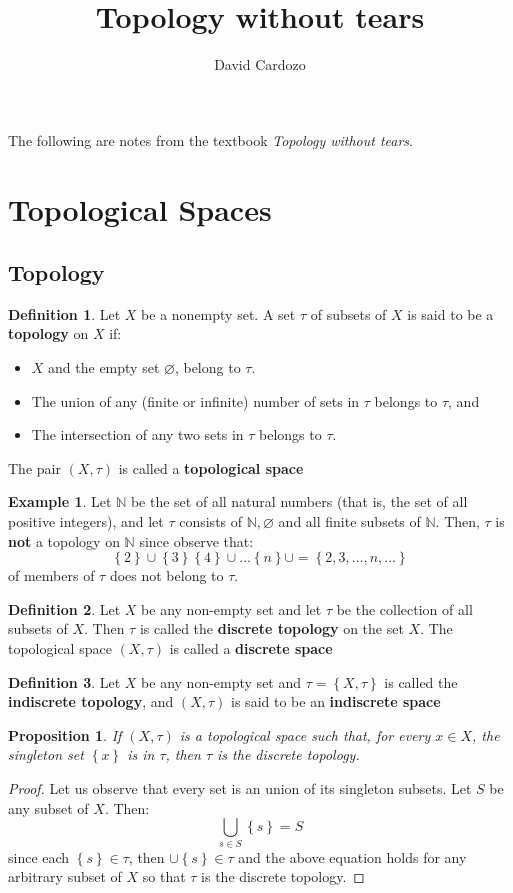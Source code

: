 \documentclass[11pt,a4paper,draft]{article}
\author{David Cardozo}
\title{Topology without tears}
\newtheorem{prop}{Proposition}[section]
\theoremstyle{definition}
\newtheorem{defn}{Definition}[section]
\newtheorem{exmp}{Example}[section]
\theoremstyle{remark}
\newcommand{\set}[1]{\left\lbrace #1 \right\rbrace}
\newcommand{\NN}{\mathbb{N}}
\begin{document}
	The following are notes from the textbook \textit{Topology without tears}.
	\section{Topological Spaces}
	\subsection{Topology}
	\begin{defn}
		Let $ X $ be a nonempty set. A set $ \tau $ of subsets of $ X $ is said to be a \textbf{topology} on $ X $ if:
		\begin{itemize}
			\item $ X $ and the empty set $ \varnothing $, belong to $ \tau $.
			\item The union of any (finite or infinite) number of sets in $ \tau $ belongs to $ \tau $, and
			\item The intersection of any two sets in $ \tau $ belongs to $ \tau $.
		\end{itemize}
		The pair $ (X,\tau) $ is called a \textbf{topological space}
	\end{defn}
	\begin{exmp}
		Let $ \NN $ be the set of all natural numbers (that is, the set of all positive integers), and let $ \tau $ consists of $ \NN, \varnothing $ and all finite subsets of $ \NN $. Then, $ \tau $ is \textbf{not} a topology on $ \mathbb{N} $ since observe that:
		\[ \set{2} \cup \set{3} \set{4} \cup \ldots \set{n} \cup = \set{2,3,\ldots,n,\ldots}  \]
		of members of $ \tau $ does not belong to $ \tau $.
	\end{exmp}
	\begin{defn}
		Let $ X $ be any non-empty set and let $ \tau $ be the collection of all subsets of $ X $. Then $ \tau $ is called the \textbf{discrete topology} on the set $ X $. The topological space $ (X,\tau) $ is called a \textbf{discrete space}
	\end{defn}
	\begin{defn}
		Let $ X $ be any non-empty set and $ \tau = \set{X,\tau} $ is called the \textbf{indiscrete topology}, and $ (X,\tau) $ is said to be an \textbf{indiscrete space}
	\end{defn}
	\begin{prop}
		If $ (X,\tau) $ is a topological space such that, for every $ x \in X $, the singleton set $ \set{x} $ is in $ \tau $, then $ \tau $ is the discrete topology.
	\end{prop}
	\begin{proof}
		Let us observe that every set is an union of its singleton subsets. Let $ S $ be any subset of $ X $. Then:
		\[ \bigcup_{s \in S} \set{s} = S \]
		since each $ \set{s} \in \tau$, then $ \cup \set{s} \in \tau$ and the above equation holds for any arbitrary subset of $ X $ so that $ \tau $ is the discrete topology.
	\end{proof}
\end{document}
